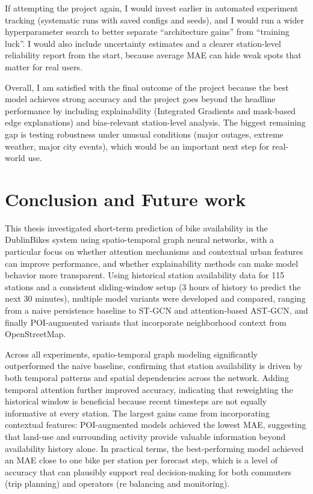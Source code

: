 \documentclass[11pt]{report}
\begin{document}
If attempting the project again, I would invest earlier in automated experiment tracking (systematic runs with saved configs and seeds), and I would run a wider hyperparameter search to better separate “architecture gains” from “training luck”. I would also include uncertainty estimates and a clearer station-level reliability report from the start, because average MAE can hide weak spots that matter for real users.

Overall, I am satisfied with the final outcome of the project because the best model achieves strong accuracy and the project goes beyond the headline performance by including explainability (Integrated Gradients and mask-based edge explanations) and bias-relevant station-level analysis. The biggest remaining gap is testing robustness under unusual conditions (major outages, extreme weather, major city events), which would be an important next step for real-world use.


\chapter{Conclusion and Future work}

This thesis investigated short-term prediction of bike availability in the DublinBikes system using spatio-temporal graph neural networks, with a particular focus on whether attention mechanisms and contextual urban features can improve performance, and whether explainability methods can make model behavior more transparent. Using historical station availability data for 115 stations and a consistent sliding-window setup (3 hours of history to predict the next 30 minutes), multiple model variants were developed and compared, ranging from a naive persistence baseline to ST-GCN and attention-based AST-GCN, and finally POI-augmented variants that incorporate neighborhood context from OpenStreetMap.

Across all experiments, spatio-temporal graph modeling significantly outperformed the naive baseline, confirming that station availability is driven by both temporal patterns and spatial dependencies across the network. Adding temporal attention further improved accuracy, indicating that reweighting the historical window is beneficial because recent timesteps are not equally informative at every station. The largest gains came from incorporating contextual features: POI-augmented models achieved the lowest MAE, suggesting that land-use and surrounding activity provide valuable information beyond availability history alone. In practical terms, the best-performing model achieved an MAE close to one bike per station per forecast step, which is a level of accuracy that can plausibly support real decision-making for both commuters (trip planning) and operators (re balancing and monitoring).
\end{document}
